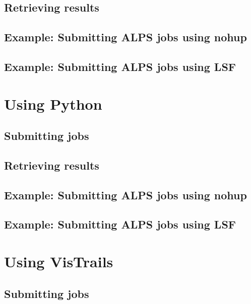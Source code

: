 \documentclass[letterpaper,10pt,english]{sphinxmanual}
\begin{document}
\subsection{Retrieving results}
\label{user/intro:retrieving-results}

\subsection{Example: Submitting ALPS jobs using nohup}
\label{user/intro:example-submitting-alps-jobs-using-nohup}

\subsection{Example: Submitting ALPS jobs using LSF}
\label{user/intro:example-submitting-alps-jobs-using-lsf}

\section{Using Python}
\label{user/intro:using-python}

\subsection{Submitting jobs}
\label{user/intro:id1}

\subsection{Retrieving results}
\label{user/intro:id2}

\subsection{Example: Submitting ALPS jobs using nohup}
\label{user/intro:id3}

\subsection{Example: Submitting ALPS jobs using LSF}
\label{user/intro:id4}

\section{Using VisTrails}
\label{user/intro:using-vistrails}

\subsection{Submitting jobs}
\label{user/intro:id5}
\end{document}
